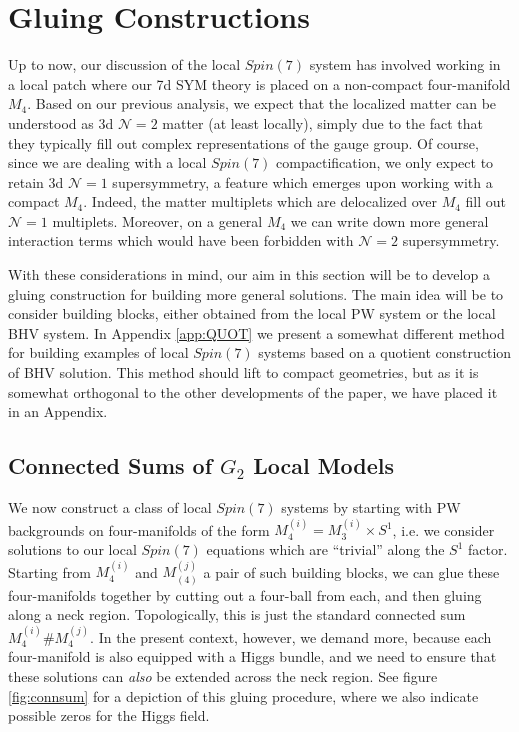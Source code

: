 \documentclass[12pt]{article}%
\numberwithin{equation}{section}
\renewcommand{\(}{\left(}
\renewcommand{\)}{\right)}
\renewcommand{\[}{\left[}
\renewcommand{\]}{\right]}
\begin{document}
\section{Gluing Constructions \label{sec:FIRSTEXAMPLES}}

Up to now, our discussion of the local $Spin(7)$ system has involved working in a local patch where our 7d SYM theory is placed on a non-compact four-manifold $M_4$. Based on our previous analysis, we expect that the localized matter can be understood as 3d $\mathcal{N} = 2$ matter (at least locally), simply due to the fact that they typically fill out complex representations of the gauge group. Of course, since we are dealing with a local $Spin(7)$ compactification, we only expect to retain 3d $\mathcal{N} = 1$ supersymmetry, a feature which emerges upon working with a compact $M_4$. Indeed, the matter multiplets which are delocalized over $M_4$ fill out $\mathcal{N} = 1$ multiplets. Moreover, on a general $M_4$ we can write down more general interaction terms which would have been forbidden with $\mathcal{N} = 2$ supersymmetry.

With these considerations in mind, our aim in this section will be to develop a gluing construction for building more general solutions. The main idea will be to consider building blocks, either obtained from the local PW system or the local BHV system. In Appendix \ref{app:QUOT} we present a somewhat different method for building examples of local $Spin(7)$ systems based on a quotient construction of
BHV solution. This method should lift to compact geometries, but as it is somewhat orthogonal
to the other developments of the paper, we have placed it in an Appendix.

\subsection{Connected Sums of $G_2$ Local Models}\label{sec:ConnSum}

We now construct a class of local $Spin(7)$ systems by starting with PW backgrounds on four-manifolds of the form $M_{4}^{(i)} = M^{(i)}_3 \times S^1$, i.e. we consider solutions to our local $Spin(7)$ equations which are ``trivial'' along the $S^1$ factor. Starting from $M_{4}^{(i)}$ and $M_{(4)}^{(j)}$ a pair of such building blocks, we can glue these four-manifolds together by cutting out a four-ball from each, and then gluing along a neck region. Topologically, this is just the standard connected sum $M_4^{(i)} \# M_{4}^{(j)}$. In the present context, however, we demand more, because each four-manifold is also equipped with a Higgs bundle, and we need to ensure that these solutions can \textit{also} be extended across the neck region. See figure \ref{fig:connsum}
for a depiction of this gluing procedure, where we also indicate possible zeros for the Higgs field.
\end{document}
